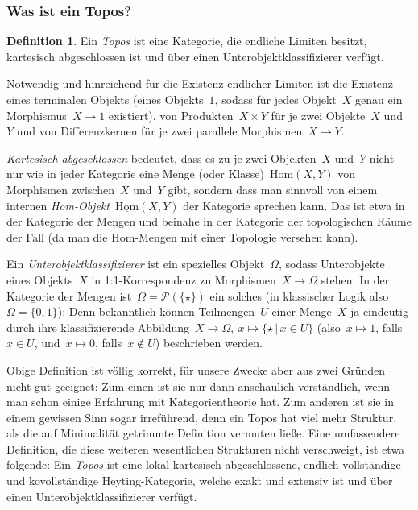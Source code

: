 \documentclass[a4paper,ngerman,12pt]{scrartcl}
\theoremstyle{definition}
\newtheorem{defn}{Definition}[section]
\theoremstyle{plain}
\theoremstyle{remark}
\renewcommand{\P}{\mathcal{P}}
\newcommand{\Hom}{\mathrm{Hom}}
\renewcommand{\_}{\mathpunct{.}\,}
\newcommand{\?}{\,{:}\,}
\begin{document}
\subsubsection*{Was ist ein Topos?}

\begin{defn}Ein \emph{Topos} ist eine Kategorie, die endliche Limiten besitzt,
kartesisch abgeschlossen ist und über einen Unterobjektklassifizierer verfügt.
\end{defn}

Notwendig und hinreichend für die Existenz endlicher Limiten ist die Existenz
eines terminalen Objekts (eines Objekts~$1$, sodass für jedes Objekt~$X$ genau
ein Morphismus~$X \to 1$ existiert), von Produkten~$X \times Y$ für je zwei
Objekte~$X$ und~$Y$ und von Differenzkernen für je zwei parallele Morphismen~$X
\to Y$.

\emph{Kartesisch abgeschlossen} bedeutet, dass es zu je zwei Objekten~$X$
und~$Y$ nicht nur wie in jeder Kategorie eine Menge (oder Klasse)~$\Hom(X,Y)$
von Morphismen zwischen~$X$ und~$Y$ gibt, sondern dass man sinnvoll von einem
internen \emph{Hom-Objekt}~$\underline{\Hom}(X,Y)$ der Kategorie sprechen kann.
Das ist etwa in der Kategorie der Mengen und beinahe in der Kategorie der
topologischen Räume der Fall (da man die Hom-Mengen mit einer Topologie
versehen kann).

Ein \emph{Unterobjektklassifizierer} ist ein spezielles Objekt~$\Omega$, sodass
Unterobjekte eines Objekts~$X$ in 1:1-Korrespondenz zu Morphismen~$X \to
\Omega$ stehen. In der Kategorie der Mengen ist~$\Omega = \P(\{\star\})$ ein solches (in
klassischer Logik also~$\Omega = \{ 0, 1 \}$): Denn bekanntlich
können Teilmengen~$U$ einer Menge~$X$ ja eindeutig durch ihre klassifizierende
Abbildung~$X \to \Omega,\ x \mapsto \{ \star \,|\, x \in U \}$ (also~$x \mapsto
1$, falls~$x \in U$, und~$x \mapsto 0$, falls~$x \not\in U$) beschrieben
werden.

Obige Definition ist völlig korrekt, für unsere Zwecke aber aus zwei
Gründen nicht gut geeignet: Zum einen ist sie nur dann anschaulich
verständlich, wenn man schon einige Erfahrung mit Kategorientheorie hat. Zum
anderen ist sie in einem gewissen Sinn sogar irreführend, denn ein Topos hat
viel mehr Struktur, als die auf Minimalität getrimmte Definition vermuten ließe.
Eine umfassendere Definition, die diese weiteren wesentlichen Strukturen nicht
verschweigt, ist etwa folgende: Ein \emph{Topos} ist eine lokal kartesisch
abgeschlossene, endlich vollständige und kovollständige Heyting-Kategorie,
welche exakt und extensiv ist und über einen Unterobjektklassifizierer verfügt.
\end{document}
